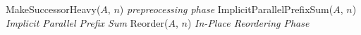 \documentclass[sigplan, 10pt, nonacm]{acmart}
\theoremstyle{remark}
\theoremstyle{remark}
\begin{document}
\begin{appendices}
\begin{figure*}
\begin{algorithmic}
      \State MakeSuccessorHeavy($A$, $n$) \Comment \emph{prepreocessing phase}
      \State ImplicitParallelPrefixSum($A$, $n$) \Comment \emph{Implicit Parallel Prefix Sum}
      \State Reorder($A$, $n$) \Comment \emph{In-Place Reordering Phase}
    \EndProcedure
	\end{algorithmic}	
\end{figure*}

\end{appendices}

\clearpage
\clearpage



\end{document}
